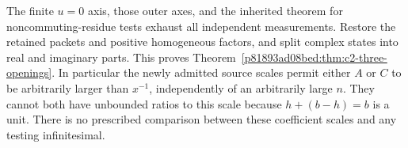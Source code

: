 The finite $u=0$ axis, those outer axes, and the inherited theorem for
noncommuting-residue tests exhaust all independent measurements.
Restore the retained packets and positive homogeneous factors, and
split complex states into real and imaginary parts.  This proves
Theorem~\ref{p81893ad08bed:thm:c2-three-openings}.  In particular the newly admitted
source scales permit either $A$ or $C$ to be arbitrarily larger than
$x^{-1}$, independently of an arbitrarily large $n$.  They cannot
both have unbounded ratios to this scale because $h+(b-h)=b$ is a unit.  There is no
prescribed comparison between these coefficient scales and any
testing infinitesimal.
